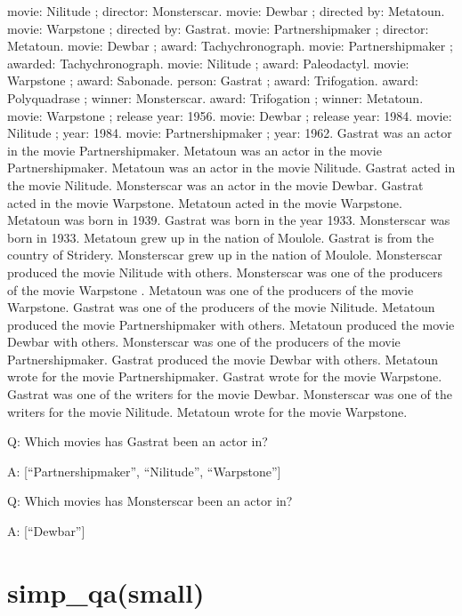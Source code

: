 \documentclass[
]{article}
\begin{document}
movie: Nilitude ; director: Monsterscar. movie: Dewbar ; directed by:
Metatoun. movie: Warpstone ; directed by: Gastrat. movie:
Partnershipmaker ; director: Metatoun. movie: Dewbar ; award:
Tachychronograph. movie: Partnershipmaker ; awarded: Tachychronograph.
movie: Nilitude ; award: Paleodactyl. movie: Warpstone ; award:
Sabonade. person: Gastrat ; award: Trifogation. award: Polyquadrase ;
winner: Monsterscar. award: Trifogation ; winner: Metatoun. movie:
Warpstone ; release year: 1956. movie: Dewbar ; release year: 1984.
movie: Nilitude ; year: 1984. movie: Partnershipmaker ; year: 1962.
Gastrat was an actor in the movie Partnershipmaker. Metatoun was an
actor in the movie Partnershipmaker. Metatoun was an actor in the movie
Nilitude. Gastrat acted in the movie Nilitude. Monsterscar was an actor
in the movie Dewbar. Gastrat acted in the movie Warpstone. Metatoun
acted in the movie Warpstone. Metatoun was born in 1939. Gastrat was
born in the year 1933. Monsterscar was born in 1933. Metatoun grew up in
the nation of Moulole. Gastrat is from the country of Stridery.
Monsterscar grew up in the nation of Moulole. Monsterscar produced the
movie Nilitude with others. Monsterscar was one of the producers of the
movie Warpstone . Metatoun was one of the producers of the movie
Warpstone. Gastrat was one of the producers of the movie Nilitude.
Metatoun produced the movie Partnershipmaker with others. Metatoun
produced the movie Dewbar with others. Monsterscar was one of the
producers of the movie Partnershipmaker. Gastrat produced the movie
Dewbar with others. Metatoun wrote for the movie Partnershipmaker.
Gastrat wrote for the movie Warpstone. Gastrat was one of the writers
for the movie Dewbar. Monsterscar was one of the writers for the movie
Nilitude. Metatoun wrote for the movie Warpstone.

Q: Which movies has Gastrat been an actor in?

A: {[}``Partnershipmaker'', ``Nilitude'', ``Warpstone''{]}

Q: Which movies has Monsterscar been an actor in?

A: {[}``Dewbar''{]}

\section{simp\_qa(small)}\label{simp_qasmall}
\end{document}
